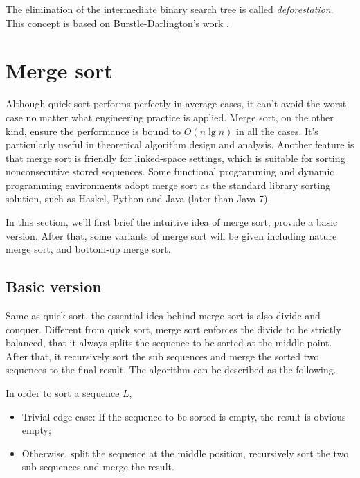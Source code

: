 \documentclass[UTF8]{article}
\begin{document}
The elimination of the intermediate binary search tree is called {\em deforestation}.
This concept is based on Burstle-Darlington's work \cite{slpj}.


\section{Merge sort}
Although quick sort performs perfectly in average cases, it can't avoid the worst case no matter what
engineering practice is applied. Merge sort, on the other kind, ensure the performance is bound to
$O(n \lg n)$ in all the cases. It's particularly useful in theoretical algorithm design and analysis.
Another feature is that merge sort is friendly for linked-space settings, which is suitable for
sorting nonconsecutive stored sequences. Some functional programming and dynamic programming environments
adopt merge sort as the standard library sorting solution, such as Haskel, Python and Java (later than
Java 7).

In this section, we'll first brief the intuitive idea of merge sort, provide a basic version.
After that, some variants of merge sort will be given including nature merge sort, and bottom-up
merge sort.

\subsection{Basic version}
Same as quick sort, the essential idea behind merge sort is also divide and conquer. Different
from quick sort, merge sort enforces the divide to be strictly balanced, that it always splits the
sequence to be sorted at the middle point. After that, it recursively sort the sub sequences
and merge the sorted two sequences to the final result. The algorithm can be described as the
following.

In order to sort a sequence $L$,
\begin{itemize}
\item Trivial edge case: If the sequence to be sorted is empty, the result is obvious empty;
\item Otherwise, split the sequence at the middle position, recursively sort the two sub sequences
and merge the result.
\end{itemize}
\end{document}
